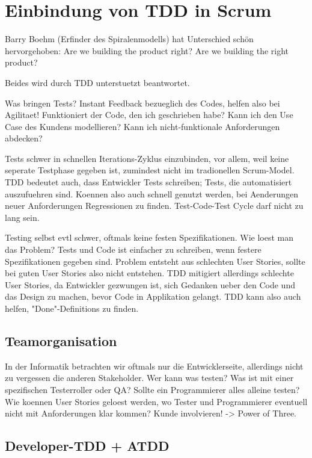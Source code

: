 \documentclass[12pt,DIV14,BCOR10mm,a4paper,twoside,parskip=half-,headsepline,headinclude,english,ngerman,bibliography=totocnumbered]{scrreprt}
\begin{document}
\chapter{Einbindung von TDD in Scrum}

Barry Boehm (Erfinder des Spiralenmodells) hat Unterschied schön hervorgehoben:
Are we building the product right?
Are we building the right product?

Beides wird durch TDD unterstuetzt beantwortet.

Was bringen Tests?
Instant Feedback bezueglich des Codes, helfen also bei Agilitaet!
Funktioniert der Code, den ich geschrieben habe?
Kann ich den Use Case des Kundens modellieren?
Kann ich nicht-funktionale Anforderungen abdecken?

Tests schwer in schnellen Iterations-Zyklus einzubinden, vor allem, weil keine seperate Testphase gegeben ist, zumindest nicht im tradionellen Scrum-Model.
TDD bedeutet auch, dass Entwickler Tests schreiben; Tests, die automatisiert auszufuehren sind.
Koennen also auch schnell genutzt werden, bei Aenderungen neuer Anforderungen Regressionen zu finden.
Test-Code-Test Cycle darf nicht zu lang sein.

Testing selbst evtl schwer, oftmals keine festen Spezifikationen.
Wie loest man das Problem?
Tests und Code ist einfacher zu schreiben, wenn festere Spezifikationen gegeben sind.
Problem entsteht aus schlechten User Stories, sollte bei guten User Stories also nicht entstehen.
TDD mitigiert allerdings schlechte User Stories, da Entwickler gezwungen ist, sich Gedanken ueber den Code und das Design zu machen, bevor Code in Applikation gelangt.
TDD kann also auch helfen, "Done"-Definitions zu finden.

\section{Teamorganisation}

In der Informatik betrachten wir oftmals nur die Entwicklerseite, allerdings nicht zu vergessen die anderen Stakeholder.
Wer kann was testen?
Was ist mit einer spezifischen Testerroller oder QA?
Sollte ein Programmierer alles alleine testen?
Wie koennen User Stories geloest werden, wo Tester und Programmierer eventuell nicht mit Anforderungen klar kommen?
Kunde involvieren! -> Power of Three.

\section{Developer-TDD + ATDD}
\end{document}
